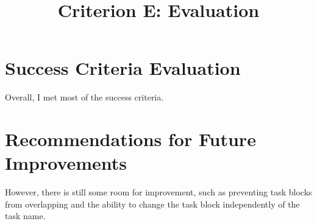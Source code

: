 \documentclass[12pt]{report}
\title{Criterion E: Evaluation}
\begin{document}
\centerline{\textcolor{msblue}{
		\textbf{\fontsize{13}{13}\MyTitle}
	}}

\section*{Success Criteria Evaluation}

Overall, I met most of the success criteria.

\section*{Recommendations for Future Improvements}
However, there is still some room for improvement, such as preventing task blocks from overlapping and the ability to change the task block independently of the task name.
\end{document}
